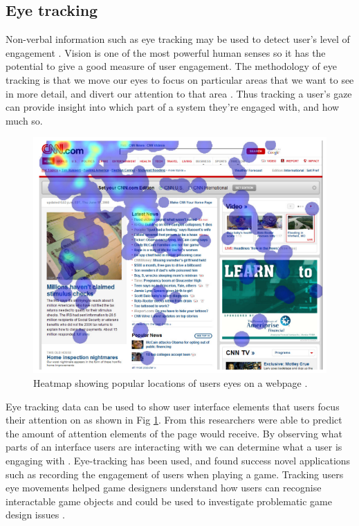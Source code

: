 \documentclass{article}
\begin{document}
\subsection{Eye tracking}

Non-verbal information such as eye tracking may be used to detect user’s level of engagement \cite{lala2017detection}.
Vision is one of the most powerful human senses so it has the potential to give a good measure of user engagement. 
The methodology of eye tracking is that we move our eyes to focus on particular areas that we want to see in more detail, and divert our attention to that area \cite{duchowski2007eye}. 
Thus tracking a user’s gaze can provide insight into which part of a system they’re engaged with, and how much so.

\begin{figure}[ht!]
    \centering
    \centerline{
        \includegraphics[scale=0.7]{EyeHeatmap.PNG}
    }
    \caption{Heatmap showing popular locations of users eyes on a webpage \cite{buscher2009you}.}
    \label{fig:eyetrack}
\end{figure}

Eye tracking data can be used to show user interface elements that users focus their attention on as shown in Fig \ref{fig:eyetrack}. 
From this researchers were able to predict the amount of attention elements of the page would receive. 
By observing what parts of an interface users are interacting with we can determine what a user is engaging with \cite{buscher2009you}.
Eye-tracking has been used, and found success novel applications such as recording the engagement of users when playing a game. 
Tracking users eye movements helped game designers understand how users can recognise interactable game objects and could be used to investigate problematic game design issues \cite{renshaw2009towards}.
\end{document}
